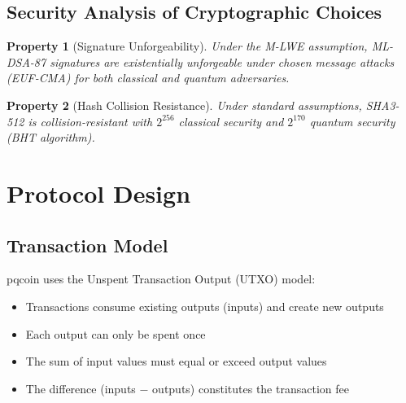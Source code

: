 \documentclass[11pt,a4paper]{article}
\newtheorem{property}{Property}
\begin{document}
\subsection{Security Analysis of Cryptographic Choices}

\begin{property}[Signature Unforgeability]
Under the M-LWE assumption, ML-DSA-87 signatures are existentially unforgeable under chosen message attacks (EUF-CMA) for both classical and quantum adversaries.
\end{property}

\begin{property}[Hash Collision Resistance]
Under standard assumptions, SHA3-512 is collision-resistant with $2^{256}$ classical security and $2^{170}$ quantum security (BHT algorithm).
\end{property}

\section{Protocol Design}

\subsection{Transaction Model}

pqcoin uses the Unspent Transaction Output (UTXO) model:

\begin{itemize}
    \item Transactions consume existing outputs (inputs) and create new outputs
    \item Each output can only be spent once
    \item The sum of input values must equal or exceed output values
    \item The difference (inputs $-$ outputs) constitutes the transaction fee
\end{itemize}
\end{document}
